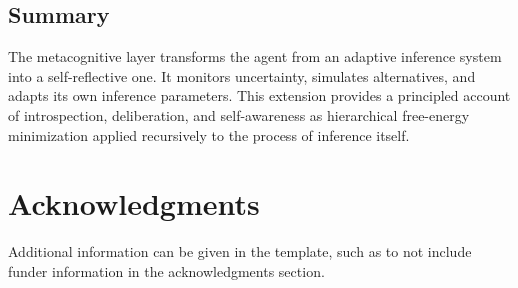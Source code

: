 \documentclass[9pt]{elife}
\begin{document}
\subsection{Summary}

The metacognitive layer transforms the agent
from an adaptive inference system into a self-reflective one.
It monitors uncertainty, simulates alternatives,
and adapts its own inference parameters.
This extension provides a principled account of introspection,
deliberation, and self-awareness as hierarchical free-energy minimization
applied recursively to the process of inference itself.


\section{Acknowledgments}

Additional information can be given in the template, such as to not include funder information in the acknowledgments section.

\nocite{*} %



\appendix
\end{document}
